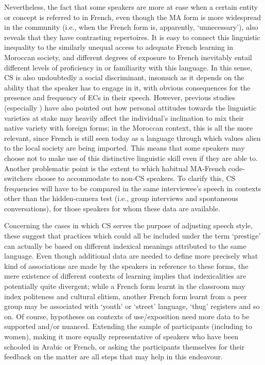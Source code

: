 \documentclass[output=paper]{langscibook}
\begin{document}
Nevertheless, the fact that some speakers are more at ease when a certain entity or concept is referred to in French, even though the \gls*{MA} form is more widespread in the community (i.e., when the French form is, apparently, ‘unnecessary'), also reveals that they have contrasting repertoires. It is easy to connect this linguistic inequality to the similarly unequal access to adequate French learning in Moroccan society, and different degrees of exposure to French inevitably entail different levels of proficiency in or familiarity with this language. In this sense, \gls*{CS} is also undoubtedly a social discriminant, insomuch as it depends on the ability that the speaker has to engage in it, with obvious consequences for the presence and frequency of \glspl*{EC} in their speech. However, previous studies (especially \citealt{post_impact_2015}) have also pointed out how personal attitudes towards the linguistic varieties at stake may heavily affect the individual’s inclination to mix their native variety with foreign forms; in the Moroccan context, this is all the more relevant, since French is still seen today as a language through which values alien to the local society are being imported. This means that some speakers may choose not to make use of this distinctive linguistic skill even if they are able to. Another problematic point is the extent to which habitual \gls*{MA}-French code-switchers choose to accommodate to non-\gls*{CS} speakers. To clarify this, \gls*{CS} frequencies will have to be compared in the same interviewee’s speech in contexts other than the hidden-camera test (i.e., group interviews and spontaneous conversations), for those speakers for whom these data are available. 

Concerning the cases in which \gls*{CS} serves the purpose of adjusting speech style, these suggest that practices which could all be included under the term ‘prestige' can actually be based on different indexical meanings attributed to the same language. Even though additional data are needed to define more precisely what kind of associations are made by the speakers in reference to these forms, the mere existence of different contexts of learning implies that indexicalities are potentially quite divergent; while a French form learnt in the classroom may index politeness and cultural elitism, another French form learnt from a peer group may be associated with ‘youth' or ‘street' language, ‘thug' registers and so on. Of course, hypotheses on contexts of use/exposition need more data to be supported and/or nuanced. Extending the sample of participants (including to women), making it more equally representative of speakers who have been schooled in Arabic or French, or asking the participants themselves for their feedback on the matter are all steps that may help in this endeavour.
\end{document}
